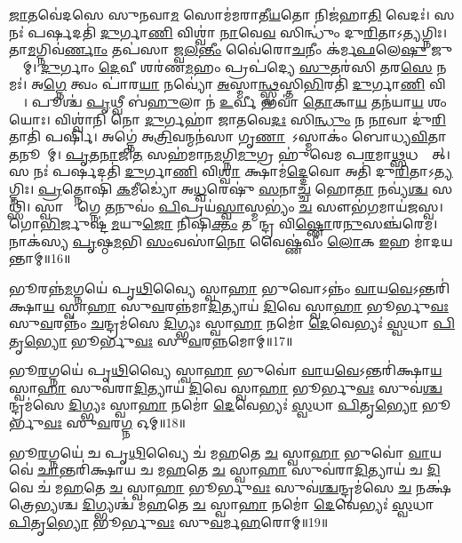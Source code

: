  \ul{𑌜𑌾}𑌤𑌵𑍇॑𑌦𑌸𑍇 𑌸𑍁𑌨𑌵𑌾\ul{𑌮} 𑌸𑍋𑌮॑𑌮𑌰𑌾𑌤𑍀\ul{𑌯}𑌤𑍋 𑌨𑌿𑌜॑𑌹𑌾\ul{𑌤𑌿} 𑌵𑍇𑌦𑌃॑। 
 𑌸 𑌨𑌃॑ 𑌪𑌰𑍍\mbox{}\ul{𑌷}𑌦𑌤𑌿॑ \ul{𑌦𑍁}𑌰𑍍𑌗𑌾\ul{𑌣𑌿} 𑌵𑌿𑌶𑍍𑌵𑌾॑ \ul{𑌨𑌾}𑌵𑍇\ul{𑌵} 𑌸𑌿𑌨𑍍𑌧𑍁𑌂॑ 𑌦𑍁\ul{𑌰𑌿}𑌤𑌾𑌽\ul{𑌤𑍍𑌯}𑌗𑍍𑌨𑌿𑌃। 
 𑌤𑌾\ul{𑌮}𑌗𑍍𑌨𑌿𑌵॑\ul{𑌰𑍍𑌣𑌾𑌂} 𑌤𑌪॑𑌸𑌾 𑌜𑍍𑌵\ul{𑌲}\ul{𑌨𑍍𑌤𑍀𑌂} 𑌵𑍈॑𑌰𑍋\ul{𑌚}𑌨𑍀𑌂 𑌕॑𑌰𑍍𑌮\ul{𑌫}𑌲𑍇\ul{𑌷𑍁} 𑌜𑍁𑌷𑍍𑌟𑌾᳚𑌮𑍍। 
 \ul{𑌦𑍁}𑌰𑍍𑌗𑌾𑌂 \ul{𑌦𑍇}𑌵𑍀 𑌶𑌰॑𑌣\ul{𑌮}𑌹𑌂 𑌪𑍍𑌰𑌪॑𑌦𑍍𑌯𑍇 \ul{𑌸𑍁}𑌤𑌰॑𑌸𑌿 𑌤𑌰\ul{𑌸𑍇} 𑌨𑌮𑌃॑। 
 𑌅\ul{𑌗𑍍𑌨𑍇} 𑌤𑍍𑌵𑌂 𑌪𑌾॑𑌰\ul{𑌯𑌾} 𑌨𑌵𑍍𑌯𑍋॑ \ul{𑌅}𑌸𑍍𑌮𑌾\ul{𑌨𑍍𑌥𑍍𑌸𑍍𑌵}𑌸𑍍𑌤𑌿\ul{𑌭𑌿}𑌰𑌤𑌿॑ \ul{𑌦𑍁}𑌰𑍍𑌗𑌾\ul{𑌣𑌿} 𑌵𑌿𑌶𑍍𑌵𑌾᳚। 
 𑌪𑍂𑌶𑍍𑌚॑ \ul{𑌪𑍃}𑌥𑍍𑌵𑍀 𑌬॑\ul{𑌹𑍁}𑌲𑌾 𑌨॑ \ul{𑌉}𑌰𑍍𑌵𑍀 𑌭𑌵𑌾॑ \ul{𑌤𑍋}𑌕𑌾\ul{𑌯} 𑌤𑌨॑𑌯𑌾\ul{𑌯} 𑌶𑌂 𑌯𑍋𑌃। 
 𑌵𑌿𑌶𑍍𑌵𑌾॑𑌨𑌿 𑌨𑍋 \ul{𑌦𑍁}𑌰𑍍𑌗𑌹𑌾॑ 𑌜𑌾𑌤𑌵𑍇\ul{𑌦𑌃} 𑌸𑌿\ul{𑌨𑍍𑌧𑍁𑌂} 𑌨 \ul{𑌨𑌾}𑌵𑌾 𑌦𑍁॑\ul{𑌰𑌿}𑌤𑌾𑌤𑌿॑ 𑌪𑌰𑍍\mbox{}𑌷𑌿। 
 𑌅𑌗𑍍𑌨𑍇॑ 𑌅\ul{𑌤𑍍𑌰𑌿}𑌵𑌨𑍍𑌮𑌨॑𑌸𑌾 𑌗𑍃\ul{𑌣𑌾}𑌨𑍋᳚𑌽𑌸𑍍𑌮𑌾𑌕𑌂॑ 𑌬𑍋𑌧𑍍𑌯\ul{𑌵𑌿}𑌤𑌾 \ul{𑌤}𑌨𑍂𑌨𑌾᳚𑌮𑍍। 
 \ul{𑌪𑍃}\ul{𑌤}\ul{𑌨𑌾}𑌜𑌿\ul{𑌤}\ul{} 𑌸𑌹॑𑌮𑌾𑌨\ul{𑌮}𑌗𑍍𑌨𑌿\ul{𑌮𑍁}𑌗𑍍𑌰 𑌹𑍁॑𑌵𑍇𑌮 𑌪\ul{𑌰}𑌮𑌾\ul{𑌥𑍍𑌸}𑌧𑌸𑍍𑌥𑌾᳚𑌤𑍍। 
 𑌸 𑌨𑌃॑ 𑌪𑌰𑍍\mbox{}\ul{𑌷}𑌦𑌤𑌿॑ \ul{𑌦𑍁}𑌰𑍍𑌗𑌾\ul{𑌣𑌿} 𑌵𑌿\ul{𑌶𑍍𑌵𑌾} 𑌕𑍍𑌷𑌾𑌮॑\ul{𑌦𑍍𑌦𑍇}𑌵𑍋 𑌅𑌤𑌿॑ 𑌦𑍁\ul{𑌰𑌿}𑌤𑌾𑌽\ul{𑌤𑍍𑌯}𑌗𑍍𑌨𑌿𑌃। 
 \ul{𑌪𑍍𑌰}𑌤𑍍𑌨𑍋𑌷𑌿॑ \ul{𑌕}𑌮𑍀𑌡𑍍𑌯𑍋॑ 𑌅\ul{𑌧𑍍𑌵}𑌰𑍇𑌷𑍁॑ \ul{𑌸}𑌨𑌾\ul{𑌚𑍍𑌚} 𑌹𑍋\ul{𑌤𑌾} 𑌨𑌵𑍍𑌯॑\ul{𑌶𑍍𑌚} 𑌸𑌥𑍍𑌸𑌿॑। 
 𑌸𑍍𑌵𑌾𑌞𑍍𑌚𑌾᳚𑌗𑍍𑌨𑍇 \ul{𑌤}𑌨𑍁𑌵𑌂॑ \ul{𑌪𑌿}𑌪𑍍𑌰𑌯॑\ul{𑌸𑍍𑌵𑌾}𑌸𑍍𑌮𑌭𑍍𑌯𑌂॑ \ul{𑌚} 𑌸𑍗𑌭॑\ul{𑌗}𑌮𑌾𑌯॑𑌜𑌸𑍍𑌵। 
 𑌗𑍋\ul{𑌭𑌿}𑌰𑍍𑌜𑍁𑌷𑍍𑌟॑\ul{𑌮}𑌯𑍁\ul{𑌜𑍋} 𑌨𑌿𑌷𑌿॑\ul{𑌕𑍍𑌤𑌂} 𑌤𑌵𑍇᳚𑌨𑍍𑌦𑍍𑌰 𑌵𑌿\ul{𑌷𑍍𑌣𑍋}𑌰\ul{𑌨𑍁}𑌸𑌞𑍍𑌚॑𑌰𑍇𑌮। 
 𑌨𑌾𑌕॑𑌸𑍍𑌯 \ul{𑌪𑍃}𑌷𑍍𑌠\ul{𑌮}𑌭𑌿 \ul{𑌸𑌂}𑌵𑌸𑌾॑\ul{𑌨𑍋} 𑌵𑍈𑌷𑍍𑌣॑𑌵𑍀𑌂 \ul{𑌲𑍋}𑌕 \ul{𑌇}𑌹 𑌮𑌾॑𑌦𑌯𑌨𑍍𑌤𑌾𑌮𑍍॥16॥
\anuvakamend%


𑌭𑍂𑌰𑌨𑍍𑌨॑\ul{𑌮}𑌗𑍍𑌨𑌯𑍇॑ 𑌪𑍃\ul{𑌥𑌿}𑌵𑍍𑌯𑍈 𑌸𑍍𑌵𑌾\ul{𑌹𑌾} 𑌭𑍁𑌵𑍋𑌽𑌨𑍍𑌨𑌂॑ \ul{𑌵𑌾}𑌯\ul{𑌵𑍇}𑌽𑌨𑍍𑌤𑌰𑌿॑𑌕𑍍𑌷𑌾\ul{𑌯} 𑌸𑍍𑌵𑌾\ul{𑌹𑌾} 𑌸𑍁\ul{𑌵}𑌰𑌨𑍍𑌨॑𑌮𑌾\ul{𑌦𑌿}𑌤𑍍𑌯𑌾𑌯॑ \ul{𑌦𑌿}𑌵𑍇 𑌸𑍍𑌵𑌾\ul{𑌹𑌾} 𑌭𑍂𑌰𑍍𑌭𑍁\ul{𑌵𑌃} 𑌸𑍁\ul{𑌵}𑌰𑌨𑍍𑌨𑌂॑ \ul{𑌚}𑌨𑍍𑌦𑍍𑌰𑌮॑𑌸𑍇 \ul{𑌦𑌿}𑌗𑍍𑌭𑍍𑌯𑌃 𑌸𑍍𑌵𑌾\ul{𑌹𑌾} 𑌨𑌮𑍋॑ \ul{𑌦𑍇}𑌵𑍇𑌭𑍍𑌯𑌃॑ \ul{𑌸𑍍𑌵}𑌧𑌾 \ul{𑌪𑌿}𑌤𑍃\ul{𑌭𑍍𑌯𑍋} 𑌭𑍂𑌰𑍍𑌭𑍁\ul{𑌵𑌃} 𑌸𑍁\ul{𑌵}𑌰\ul{𑌨𑍍𑌨}𑌮𑍋𑌮𑍍॥17॥
\anuvakamend

𑌭𑍂\ul{𑌰}𑌗𑍍𑌨𑌯𑍇॑ 𑌪𑍃\ul{𑌥𑌿}𑌵𑍍𑌯𑍈 𑌸𑍍𑌵𑌾\ul{𑌹𑌾} 𑌭𑍁𑌵𑍋॑ \ul{𑌵𑌾}𑌯\ul{𑌵𑍇}𑌽𑌨𑍍𑌤𑌰𑌿॑𑌕𑍍𑌷𑌾\ul{𑌯} 𑌸𑍍𑌵𑌾\ul{𑌹𑌾} 𑌸𑍁𑌵॑𑌰𑌾\ul{𑌦𑌿}𑌤𑍍𑌯𑌾𑌯॑ \ul{𑌦𑌿}𑌵𑍇 𑌸𑍍𑌵𑌾\ul{𑌹𑌾} 𑌭𑍂𑌰𑍍𑌭𑍁\ul{𑌵𑌃} 𑌸𑍁𑌵॑\ul{𑌶𑍍𑌚}𑌨𑍍𑌦𑍍𑌰𑌮॑𑌸𑍇 \ul{𑌦𑌿}𑌗𑍍𑌭𑍍𑌯𑌃 𑌸𑍍𑌵𑌾\ul{𑌹𑌾} 𑌨𑌮𑍋॑ \ul{𑌦𑍇}𑌵𑍇𑌭𑍍𑌯𑌃॑ \ul{𑌸𑍍𑌵}𑌧𑌾 \ul{𑌪𑌿}𑌤𑍃\ul{𑌭𑍍𑌯𑍋} 𑌭𑍂𑌰𑍍𑌭𑍁\ul{𑌵𑌃} 𑌸𑍁\ul{𑌵}𑌰\ul{𑌗𑍍𑌨} 𑌓𑌮𑍍॥18॥
\anuvakamend

𑌭𑍂\ul{𑌰}𑌗𑍍𑌨𑌯𑍇॑ 𑌚 𑌪𑍃\ul{𑌥𑌿}𑌵𑍍𑌯𑍈 𑌚॑ 𑌮\ul{𑌹}𑌤𑍇 \ul{𑌚} 𑌸𑍍𑌵𑌾\ul{𑌹𑌾} 𑌭𑍁𑌵𑍋॑ \ul{𑌵𑌾}𑌯𑌵𑍇॑ \ul{𑌚𑌾}𑌨𑍍𑌤𑌰𑌿॑𑌕𑍍𑌷𑌾𑌯 𑌚 𑌮\ul{𑌹}𑌤𑍇 \ul{𑌚} 𑌸𑍍𑌵𑌾\ul{𑌹𑌾} 𑌸𑍁𑌵॑𑌰𑌾\ul{𑌦𑌿}𑌤𑍍𑌯𑌾𑌯॑ 𑌚 \ul{𑌦𑌿}𑌵𑍇 𑌚॑ 𑌮\ul{𑌹}𑌤𑍇 \ul{𑌚} 𑌸𑍍𑌵𑌾\ul{𑌹𑌾} 𑌭𑍂𑌰𑍍𑌭𑍁\ul{𑌵𑌃} 𑌸𑍁𑌵॑\ul{𑌶𑍍𑌚}𑌨𑍍𑌦𑍍𑌰𑌮॑𑌸𑍇 \ul{𑌚} 𑌨𑌕𑍍𑌷॑𑌤𑍍𑌰𑍇𑌭𑍍𑌯𑌶𑍍𑌚 \ul{𑌦𑌿}𑌗𑍍𑌭𑍍𑌯𑌶𑍍𑌚॑ 𑌮\ul{𑌹}𑌤𑍇 \ul{𑌚} 𑌸𑍍𑌵𑌾\ul{𑌹𑌾} 𑌨𑌮𑍋॑ \ul{𑌦𑍇}𑌵𑍇𑌭𑍍𑌯𑌃॑ \ul{𑌸𑍍𑌵}𑌧𑌾 \ul{𑌪𑌿}𑌤𑍃\ul{𑌭𑍍𑌯𑍋} 𑌭𑍂𑌰𑍍𑌭𑍁\ul{𑌵𑌃} 𑌸𑍁\ul{𑌵}𑌰𑍍𑌮\ul{𑌹}𑌰𑍋𑌮𑍍॥19॥ 
\anuvakamend

